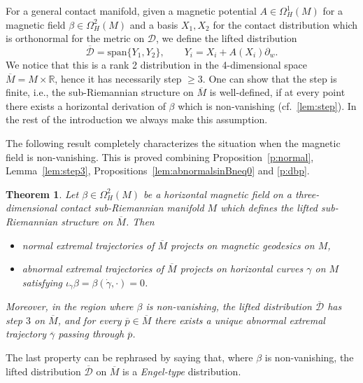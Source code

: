 \documentclass{amsart}
\theoremstyle{plain}
\newtheorem{theorem}{Theorem}
\theoremstyle{definition}
\theoremstyle{remark}
\newcommand{\R}{\mathbb{R}}
\newcommand{\p}{\partial}												%
\newcommand{\g}{\gamma}
\newcommand{\sr}{sub-{R}ie\-man\-nian }
\newcommand{\distr}{\mathcal{D}}								%
\newcommand{\B}{\beta}
\newcommand{\lift}[1]{\overline{#1}} 							%
\begin{document}
For a general contact manifold, given a magnetic potential $A\in \Omega^{1}_{H}(M)$ for a magnetic field $\B\in\Omega^2_H(M)$ and a basis $X_1,X_2$ for the contact distribution which is orthonormal for the metric on $\distr$, we define the lifted distribution 
\begin{equation}
	\lift \distr=\mathrm{span}\{Y_1,Y_{2}\}, \qquad Y_{i}=X_i+ A (X_i)\p_w.
\end{equation}
We notice that this is a rank 2 distribution in the 4-dimensional space $\lift M=M\times \R$, hence it has necessarily step $\geq 3$. One can show that the step is finite, i.e., the sub-Riemannian structure on $\lift M$ is well-defined, if at every point there exists a horizontal derivation of $\beta$ which is non-vanishing (cf.\ \cref{lem:step}). In the rest of the introduction we always make this assumption. 

 
  
  The following result completely characterizes the situation when the magnetic field is non-vanish\-ing. This is proved combining Proposition~\ref{p:normal}, Lemma~\ref{lem:step3}, Propositions~\ref{lem:abnormalsinBneq0} and \ref{p:dbp}.
 \begin{theorem} 
\label{intro:nonvanishing}
Let  $\B\in\Omega^2_H(M)$ be a horizontal magnetic field on a three-dimensional contact \sr manifold $M$ which defines the lifted sub-Riemannian structure on $\lift M$.  Then
\begin{itemize}
\item[(a)] normal extremal trajectories of $\lift M$ projects on magnetic geodesics on $M$,
\item[(b)] abnormal extremal trajectories of $\lift M$ projects on horizontal curves $\gamma$ on $M$ satisfying $\iota_{\dot \gamma}\beta=\beta(\dot \gamma,\cdot)=0$.
\end{itemize}
Moreover, in the region where $\B$ is non-vanishing, the lifted distribution $\lift \distr$  has step $3$ on $\lift M$, and for every $\lift p\in \lift M$ there exists a unique abnormal extremal trajectory $\lift \g$ passing through $\lift p$.
\end{theorem}
The last property can be rephrased by saying that, where $\B$ is non-vanishing, the lifted distribution $\lift \distr$ on $\lift M$  is a \emph{Engel-type} distribution.
\end{document}

